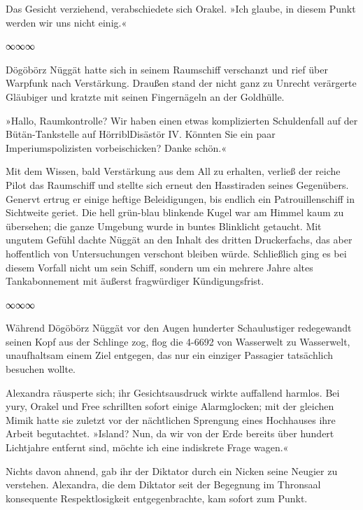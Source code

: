 Das Gesicht verziehend, verabschiedete sich Orakel. »Ich glaube, in diesem Punkt werden wir uns nicht einig.«

\begin{center}
∞∞∞
\end{center}

Dögöbörz Nüggät hatte sich in seinem Raumschiff verschanzt und rief über Warpfunk nach Verstärkung. Draußen stand der nicht ganz zu Unrecht verärgerte Gläubiger und kratzte mit seinen Fingernägeln an der Goldhülle.

 »Hallo, Raumkontrolle? Wir haben einen etwas komplizierten Schuldenfall auf der Bütän-Tankstelle auf HörriblDisästör IV. Könnten Sie ein paar Imperiumspolizisten vorbeischicken? Danke schön.«

Mit dem Wissen, bald Verstärkung aus dem All zu erhalten, verließ der reiche Pilot das Raumschiff und stellte sich erneut den Hasstiraden seines Gegenübers. Genervt ertrug er einige heftige Beleidigungen, bis endlich ein Patrouillenschiff in Sichtweite geriet. Die hell grün-blau blinkende Kugel war am Himmel kaum zu übersehen; die ganze Umgebung wurde in buntes Blinklicht getaucht. Mit ungutem Gefühl dachte Nüggät an den Inhalt des dritten Druckerfachs, das aber hoffentlich von Untersuchungen verschont bleiben würde. Schließlich ging es bei diesem Vorfall nicht um sein Schiff, sondern um ein mehrere Jahre altes Tankabonnement mit äußerst fragwürdiger Kündigungsfrist.

\begin{center}
∞∞∞
\end{center}

Während Dögöbörz Nüggät vor den Augen hunderter Schaulustiger redegewandt seinen Kopf aus der Schlinge zog, flog die 4-6692 von Wasserwelt zu Wasserwelt, unaufhaltsam einem Ziel entgegen, das nur ein einziger Passagier tatsächlich besuchen wollte.

Alexandra räusperte sich; ihr Gesichtsausdruck wirkte auffallend harmlos. Bei yury, Orakel und Free schrillten sofort einige Alarmglocken; mit der gleichen Mimik hatte sie zuletzt vor der nächtlichen Sprengung eines Hochhauses ihre Arbeit begutachtet. »Island? Nun, da wir von der Erde bereits über hundert Lichtjahre entfernt sind, möchte ich eine indiskrete Frage wagen.«

Nichts davon ahnend, gab ihr der Diktator durch ein Nicken seine Neugier zu verstehen. Alexandra, die dem Diktator seit der Begegnung im Thronsaal konsequente Respektlosigkeit entgegenbrachte, kam sofort zum Punkt.

